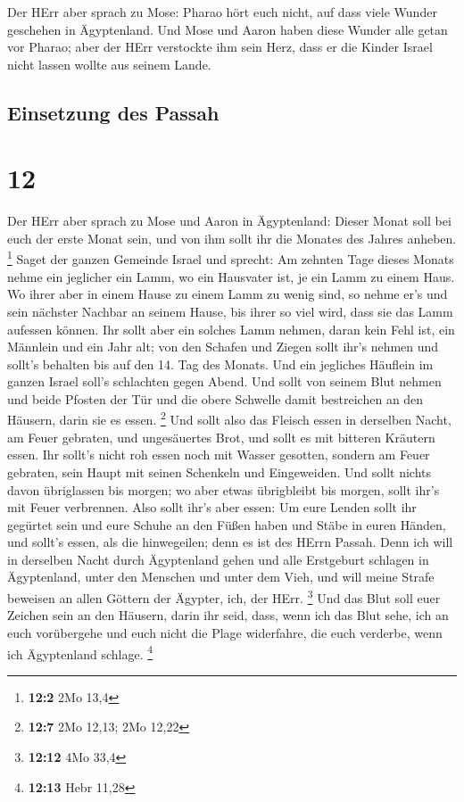  Der HErr aber sprach zu Mose: Pharao hört euch nicht, auf
dass viele Wunder geschehen in Ägyptenland.  Und Mose und
Aaron haben diese Wunder alle getan vor Pharao; aber der HErr verstockte
ihm sein Herz, dass er die Kinder Israel nicht lassen wollte aus seinem
Lande.

\hypertarget{einsetzung-des-passah}{%
\subsection{Einsetzung des Passah}\label{einsetzung-des-passah}}

\hypertarget{section-11}{%
\section{12}\label{section-11}}

 Der HErr aber sprach zu Mose und Aaron in Ägyptenland:
 Dieser Monat soll bei euch der erste Monat sein, und von
ihm sollt ihr die Monates des Jahres anheben. \footnote{\textbf{12:2}
  2Mo 13,4}  Saget der ganzen Gemeinde Israel und sprecht:
Am zehnten Tage dieses Monats nehme ein jeglicher ein Lamm, wo ein
Hausvater ist, je ein Lamm zu einem Haus.  Wo ihrer aber
in einem Hause zu einem Lamm zu wenig sind, so nehme er's und sein
nächster Nachbar an seinem Hause, bis ihrer so viel wird, dass sie das
Lamm aufessen können.  Ihr sollt aber ein solches Lamm
nehmen, daran kein Fehl ist, ein Männlein und ein Jahr alt; von den
Schafen und Ziegen sollt ihr's nehmen  und sollt's
behalten bis auf den 14. Tag des Monats. Und ein jegliches Häuflein im
ganzen Israel soll's schlachten gegen Abend.  Und sollt
von seinem Blut nehmen und beide Pfosten der Tür und die obere Schwelle
damit bestreichen an den Häusern, darin sie es essen. \footnote{\textbf{12:7}
  2Mo 12,13; 2Mo 12,22}  Und sollt also das Fleisch essen
in derselben Nacht, am Feuer gebraten, und ungesäuertes Brot, und sollt
es mit bitteren Kräutern essen.  Ihr sollt's nicht roh
essen noch mit Wasser gesotten, sondern am Feuer gebraten, sein Haupt
mit seinen Schenkeln und Eingeweiden.  Und sollt nichts
davon übriglassen bis morgen; wo aber etwas übrigbleibt bis morgen,
sollt ihr's mit Feuer verbrennen.  Also sollt ihr's aber
essen: Um eure Lenden sollt ihr gegürtet sein und eure Schuhe an den
Füßen haben und Stäbe in euren Händen, und sollt's essen, als die
hinwegeilen; denn es ist des HErrn Passah.  Denn ich will
in derselben Nacht durch Ägyptenland gehen und alle Erstgeburt schlagen
in Ägyptenland, unter den Menschen und unter dem Vieh, und will meine
Strafe beweisen an allen Göttern der Ägypter, ich, der HErr. \footnote{\textbf{12:12}
  4Mo 33,4}  Und das Blut soll euer Zeichen sein an den
Häusern, darin ihr seid, dass, wenn ich das Blut sehe, ich an euch
vorübergehe und euch nicht die Plage widerfahre, die euch verderbe, wenn
ich Ägyptenland schlage. \footnote{\textbf{12:13} Hebr 11,28}


